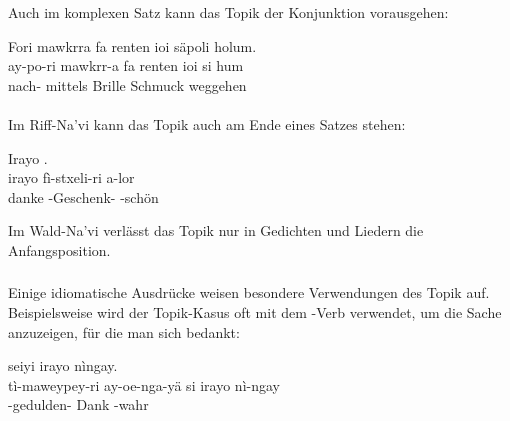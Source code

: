 \noindent Auch im komplexen Satz kann das Topik der Konjunktion vorausgehen:

\begin{interlin}
	\glll \Npawl{}Fori mawkrra fa renten ioi säpoli holum. \\
	ay-po-ri mawkrr-a fa renten ioi si hum \\
	 nach- mittels Brille Schmuck  weggehen \\
\end{interlin}

\paragraph{} 
Im Riff-Na'vi kann das Topik auch am Ende eines Satzes stehen:

\begin{interlin}
	\glll Irayo  . \\
	irayo fì-stxeli-ri a-lor \\
	danke -Geschenk- -schön \\
\end{interlin}

\noindent Im Wald-Na'vi verlässt das Topik nur in Gedichten und Liedern die Anfangsposition. \\\Omaticon

\subsubsection{} Einige idiomatische Ausdrücke weisen besondere Verwendungen des Topik auf. Beispielsweise wird der Topik-Kasus oft mit dem -Verb   verwendet, um die Sache anzuzeigen, für die man sich bedankt:

\begin{interlin}
	\glll \Npawl{}  seiyi irayo nìngay. \\
	tì-maweypey-ri ay-oe-nga-yä si irayo nì-ngay \\
	-gedulden-   Dank -wahr \\
\end{interlin}

